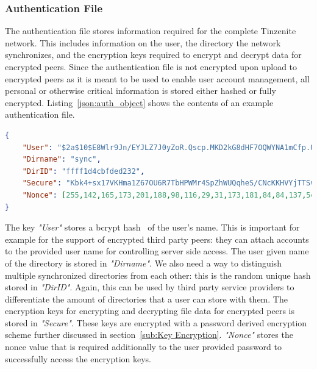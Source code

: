 \subsubsection{Authentication File}
\label{subs:Authentication File}

The authentication file stores information required for the complete Tinzenite network.
This includes information on the user, the directory the network synchronizes, and the encryption keys required to encrypt and decrypt data for encrypted peers.
Since the authentication file is not encrypted upon upload to encrypted peers as it is meant to be used to enable user account management, all personal or otherwise critical information is stored either hashed or fully encrypted.
Listing~\ref{json:auth_object} shows the contents of an example authentication file.

\begin{listing}[htp]
    \begin{lstlisting}[language=json,firstnumber=0]
{
    "User": "$2a$10$E8Wlr9Jn/EYJLZ7J0yZoR.Qscp.MKD2kG8dHF7OQWYNA1mCfp.Qqe",
    "Dirname": "sync",
    "DirID": "ffff1d4cbfded232",
    "Secure": "Kbk4+sx17VKHma1Z67OU6R7TbHPWMr4SpZhWUQqheS/CNcKKHVYjTTSv0rbF4qDAa0vwikigsm7wHhy4iGjWB84i0ErO7rNwhqrPPxudeDM=",
    "Nonce": [255,142,165,173,201,188,98,116,29,31,173,181,84,84,137,54,159,50,193,248,51,162,76,195]
}
    \end{lstlisting}
\caption[Authentication JSON Object]{An example of an authentication file.}
\label{json:auth_object}
\end{listing}

The key \textit{"User"} stores a bcrypt hash~\cite{provos1999future} of the user's name.
This is important for example for the support of encrypted third party peers: they can attach accounts to the provided user name for controlling server side access.
The user given name of the directory is stored in \textit{"Dirname"}.
We also need a way to distinguish multiple synchronized directories from each other: this is the random unique hash stored in \textit{"DirID"}.
Again, this can be used by third party service providers to differentiate the amount of directories that a user can store with them.
The encryption keys for encrypting and decrypting file data for encrypted peers is stored in \textit{"Secure"}.
These keys are encrypted with a password derived encryption scheme further discussed in section~\ref{sub:Key Encryption}.
\textit{"Nonce"} stores the nonce value that is required additionally to the user provided password to successfully access the encryption keys.

